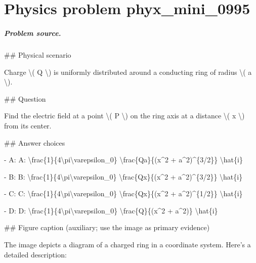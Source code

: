 
\chapter{Physics problem phyx\_mini\_0995}
\label{ch:PhyXMiniProblems_problem_phyx_mini_0995}

\paragraph{Problem source.}
\#\# Physical scenario

Charge \textbackslash{}( Q \textbackslash{}) is uniformly distributed around a conducting ring of radius \textbackslash{}( a \textbackslash{}).

\#\# Question

Find the electric field at a point \textbackslash{}( P \textbackslash{}) on the ring axis at a distance \textbackslash{}( x \textbackslash{}) from its center.

\#\# Answer choices

- A: A: \textbackslash{}frac\{1\}\{4\textbackslash{}pi\textbackslash{}varepsilon\_0\} \textbackslash{}frac\{Qa\}\{(x\textasciicircum{}2 + a\textasciicircum{}2)\textasciicircum{}\{3/2\}\} \textbackslash{}hat\{i\}

- B: B: \textbackslash{}frac\{1\}\{4\textbackslash{}pi\textbackslash{}varepsilon\_0\} \textbackslash{}frac\{Qx\}\{(x\textasciicircum{}2 + a\textasciicircum{}2)\textasciicircum{}\{3/2\}\} \textbackslash{}hat\{i\}

- C: C: \textbackslash{}frac\{1\}\{4\textbackslash{}pi\textbackslash{}varepsilon\_0\} \textbackslash{}frac\{Qx\}\{(x\textasciicircum{}2 + a\textasciicircum{}2)\textasciicircum{}\{1/2\}\} \textbackslash{}hat\{i\}

- D: D: \textbackslash{}frac\{1\}\{4\textbackslash{}pi\textbackslash{}varepsilon\_0\} \textbackslash{}frac\{Q\}\{(x\textasciicircum{}2 + a\textasciicircum{}2)\} \textbackslash{}hat\{i\}

\#\# Figure caption (auxiliary; use the image as primary evidence)

The image depicts a diagram of a charged ring in a coordinate system. Here's a detailed description:


